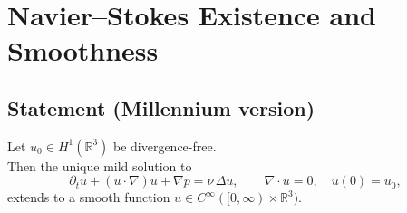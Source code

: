 \chapter{Navier–Stokes Existence and Smoothness}

\section*{Statement (Millennium version)}
\begin{theorem}\label{NS:statement}
Let $u_{0}\in H^{1}(\mathbb R^{3})$ be divergence-free.  \\
Then the unique mild solution to
\[
\partial_{t} u + (u\!\cdot\!\nabla)u + \nabla p = \nu\,\Delta u,\qquad
\nabla\!\cdot u = 0,\quad u(0)=u_{0},
\]
extends to a smooth function $u\in C^{\infty}([0,\infty)\times\mathbb R^{3})$.
\end{theorem}

\bigskip







\appendix




